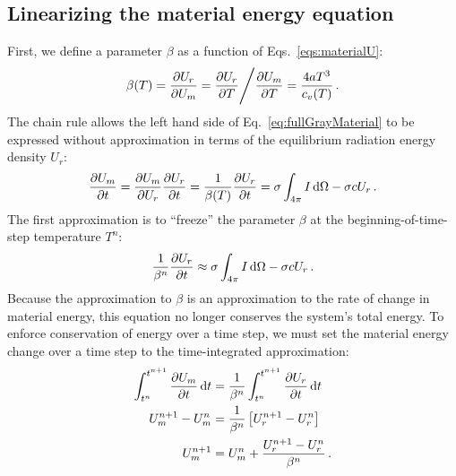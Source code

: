 \subsection{Linearizing the material energy equation}
First, we define a parameter $\beta$ as a function of Eqs.~\eqref{eqs:materialU}:
\begin{equation} \label{eq:beta}
  \beta(T) = \frac{\partial U_r}{\partial U_m} 
  = \frac{\partial U_r}{\partial T} \Bigg/ \frac{\partial U_m}{\partial T}
  = \frac{4 a T^3}{c_v(T)} \,.
\end{equation}
The chain rule allows the left hand side of Eq.~\eqref{eq:fullGrayMaterial} to be
expressed without approximation in terms of the equilibrium radiation energy
density $U_r$:
\begin{equation*}
  \frac{\partial U_m}{\partial t} = \frac{\partial U_m}{\partial U_r} \frac{\partial U_r}{\partial t} = \frac{1}{\beta(T)}
  \frac{\partial U_r}{\partial t} = \sigma \int_{4\pi}  I \mathop{}\!\mathrm{d} \Omega - \sigma c U_r \,.
\end{equation*}
The first approximation is to ``freeze'' the parameter $\beta$ at the beginning-of-time-step temperature $T^n$:
\begin{equation}\label{eq:frozenBeta}
  \frac{1}{\beta^n}
  \frac{\partial U_r}{\partial t} \approx \sigma \int_{4\pi}  I \mathop{}\!\mathrm{d} \Omega - \sigma c U_r \,.
\end{equation}
Because the approximation to $\beta$ is an approximation to the rate of change
in material energy, this equation no longer conserves the system's total
energy. To enforce conservation of energy over a time step, we must set the
material energy change over a time step to the time-integrated approximation:
\begin{align}
  \nonumber
  \int_{t^n}^{t^{n+1}}  \frac{\partial U_m}{\partial t}\mathop{}\!\mathrm{d} t &= \frac{1}{\beta^n}
  \int_{t^n}^{t^{n+1}} \frac{\partial U_r}{\partial t}\mathop{}\!\mathrm{d} t
  \\
  \nonumber
  U_m^{n+1} - U_m^n &= \frac{1}{\beta^n} \left[ U_r^{n+1} - U_r^n \right]
  \\
  \label{eq:matenConservationUpdate}
  U_m^{n+1} &=  U_m^n + \frac{U_r^{n+1} - U_r^n}{\beta^n}\,.
\end{align}

